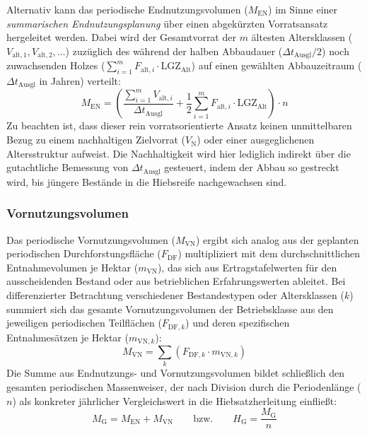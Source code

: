 \documentclass[twocolumn, paper=a4, fontsize=10pt]{scrartcl}
\begin{document}
Alternativ kann das periodische Endnutzungsvolumen ($M_{\text{EN}}$) im Sinne einer \emph{summarischen Endnutzungsplanung} über einen abgekürzten Vorratsansatz hergeleitet werden. Dabei wird der Gesamtvorrat der $m$ ältesten Altersklassen ($V_{\text{alt},1}, V_{\text{alt},2}, \dots$) zuzüglich des während der halben Abbaudauer ($\Delta t_{\text{Ausgl}}/2$) noch zuwachsenden Holzes ($\sum_{i=1}^{m} F_{\text{alt},i} \cdot \text{LGZ}_{\text{Alt}}$) auf einen gewählten Abbauzeitraum ($\Delta t_{\text{Ausgl}}$ in Jahren) verteilt:
\begin{equation}
    \label{eq:men_vorrat}
    M_{\text{EN}} = \left( \frac{\sum_{i=1}^{m} V_{\text{alt},i}}{\Delta t_{\text{Ausgl}}} + \frac{1}{2} \sum_{i=1}^{m} F_{\text{alt},i} \cdot \text{LGZ}_{\text{Alt}} \right) \cdot n
\end{equation}
Zu beachten ist, dass dieser rein vorratsorientierte Ansatz keinen unmittelbaren Bezug zu einem nachhaltigen Zielvorrat ($V_{\text{N}}$) oder einer ausgeglichenen Altersstruktur aufweist. Die Nachhaltigkeit wird hier lediglich indirekt über die gutachtliche Bemessung von $\Delta t_{\text{Ausgl}}$ gesteuert, indem der Abbau so gestreckt wird, bis jüngere Bestände in die Hiebsreife nachgewachsen sind.

\subsubsection{Vornutzungsvolumen}

Das periodische Vornutzungsvolumen ($M_{\text{VN}}$) ergibt sich analog aus der geplanten periodischen Durchforstungsfläche ($F_{\text{DF}}$) multipliziert mit dem durchschnittlichen Entnahmevolumen je Hektar ($m_{\text{VN}}$), das sich aus Ertragstafelwerten für den ausscheidenden Bestand oder aus betrieblichen Erfahrungswerten ableitet. Bei differenzierter Betrachtung verschiedener Bestandestypen oder Altersklassen ($k$) summiert sich das gesamte Vornutzungsvolumen der Betriebsklasse aus den jeweiligen periodischen Teilflächen ($F_{\text{DF},k}$) und deren spezifischen Entnahmesätzen je Hektar ($m_{\text{VN},k}$):
\begin{equation}
    \label{eq:mvn_typen}
    M_{\text{VN}} = \sum_{k} \left( F_{\text{DF},k} \cdot m_{\text{VN},k} \right)
\end{equation}
Die Summe aus Endnutzungs- und Vornutzungsvolumen bildet schließlich den gesamten periodischen Massenweiser, der nach Division durch die Periodenlänge ($n$) als konkreter jährlicher Vergleichswert in die Hiebsatzherleitung einfließt:
\begin{equation}
    \label{eq:mg_hg}
    M_{\text{G}} = M_{\text{EN}} + M_{\text{VN}} \qquad \text{bzw.} \qquad H_{\text{G}} = \frac{M_{\text{G}}}{n}
\end{equation}
\end{document}
